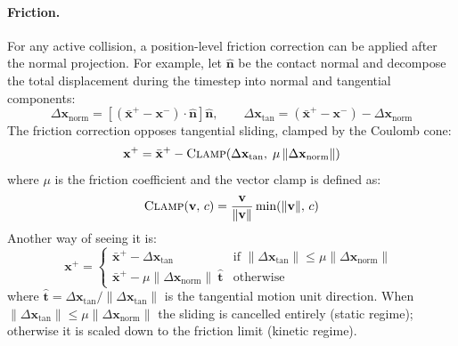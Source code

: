 \documentclass{article}
\begin{document}
\paragraph{Friction.}
For any active collision, a position-level friction correction can be applied after the normal projection. For example, let $\hat{\mathbf{n}}$ be the contact normal and decompose the total displacement during the timestep into normal and tangential components:
\begin{equation*}
    \Delta\mathbf{x}_{\text{norm}} = \left[(\bar{\mathbf{x}}^+ - \mathbf{x}^-)\cdot\hat{\mathbf{n}}\right]\hat{\mathbf{n}},
    \qquad
    \Delta\mathbf{x}_{\text{tan}}  = (\bar{\mathbf{x}}^+ - \mathbf{x}^-) - \Delta\mathbf{x}_{\text{norm}}
\end{equation*}
The friction correction opposes tangential sliding, clamped by the Coulomb cone:
\begin{equation}
\label{eq:friction_correction}
    \mathbf{x}^+ = \bar{\mathbf{x}}^+ - \textsc{Clamp}(\Delta\mathbf{x}_{\text{tan}},\; \mu\,\|\Delta\mathbf{x}_{\text{norm}}\|)
\end{equation}
where $\mu$ is the friction coefficient and the vector clamp is defined as:
\begin{equation*}
    \textsc{Clamp}(\mathbf{v},\, c) = \frac{\mathbf{v}}{\|\mathbf{v}\|}\min(\|\mathbf{v}\|,\, c)
\end{equation*}
Another way of seeing it is:
\begin{equation}
\label{eq:friction_cases}
    \mathbf{x}^+ = \begin{cases}
        \bar{\mathbf{x}}^+ - \Delta\mathbf{x}_{\text{tan}} & \text{if } \|\Delta\mathbf{x}_{\text{tan}}\| \leq \mu\|\Delta\mathbf{x}_{\text{norm}}\| \ \\
        \bar{\mathbf{x}}^+ - \mu\|\Delta\mathbf{x}_{\text{norm}}\|\ \hat{\mathbf{t}}& \text{otherwise }
    \end{cases}
\end{equation}
where $\hat{\mathbf{t}} = {\Delta\mathbf{x}_{\text{tan}}}/{\|\Delta\mathbf{x}_{\text{tan}}\|}$ is the tangential motion unit direction. When $\|\Delta\mathbf{x}_{\text{tan}}\| \leq \mu\|\Delta\mathbf{x}_{\text{norm}}\|$ the sliding is cancelled entirely (static regime); otherwise it is scaled down to the friction limit (kinetic regime).
\end{document}
